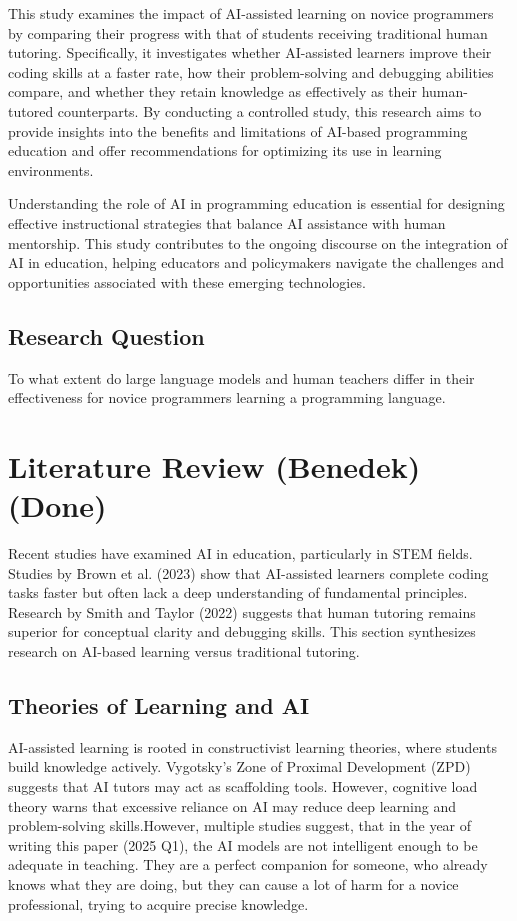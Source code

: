 \documentclass[12pt]{article}  %
\begin{document}
This study examines the impact of AI-assisted learning on novice programmers by comparing their progress with that of students receiving traditional human tutoring. Specifically, it investigates whether AI-assisted learners improve their coding skills at a faster rate, how their problem-solving and debugging abilities compare, and whether they retain knowledge as effectively as their human-tutored counterparts. By conducting a controlled study, this research aims to provide insights into the benefits and limitations of AI-based programming education and offer recommendations for optimizing its use in learning environments.

Understanding the role of AI in programming education is essential for designing effective instructional strategies that balance AI assistance with human mentorship. This study contributes to the ongoing discourse on the integration of AI in education, helping educators and policymakers navigate the challenges and opportunities associated with these emerging technologies.

\subsection{Research Question}

To what extent do large language models and human teachers differ in their effectiveness for novice programmers learning a programming language.

\section{Literature Review (Benedek) (Done)}

Recent studies have examined AI in education, particularly in STEM fields. Studies by Brown et al. (2023) show that AI-assisted learners complete coding tasks faster but often lack a deep understanding of fundamental principles. Research by Smith and Taylor (2022) suggests that human tutoring remains superior for conceptual clarity and debugging skills. This section synthesizes research on AI-based learning versus traditional tutoring.

\subsection{Theories of Learning and AI}
AI-assisted learning is rooted in constructivist learning theories, where students build knowledge actively. Vygotsky's Zone of Proximal Development (ZPD) suggests that AI tutors may act as scaffolding tools. However, cognitive load theory warns that excessive reliance on AI may reduce deep learning and problem-solving skills.However, multiple studies suggest, that in the year of writing this paper (2025 Q1), the AI models are not intelligent enough to be adequate in teaching. They are a perfect companion for someone, who already knows what they are doing, but they can cause a lot of harm for a novice professional, trying to acquire precise knowledge. \cite{https://dl.acm.org/doi/pdf/10.1145/3632620.3671116}
\end{document}

